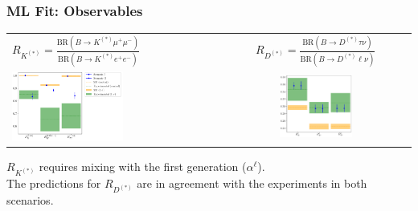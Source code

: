 \documentclass[mathserif, 10pt, dvipsnames]{beamer}
\begin{document}
\begin{frame}\frametitle{ML Fit: Observables}

    \begin{center}
        \begin{tabular}{lc}
            $R_{K^{(*)}} = \frac{\mathrm{BR}(B\to K^{(*)}\mu^+ \mu^-)}{\mathrm{BR}(B\to K^{(*)}e^+ e^-)}$ & $R_{D^{(*)}} = \frac{\mathrm{BR}(B\to D^{(*)}\tau \nu)}{\mathrm{BR}(B\to D^{(*)}\ell \nu)}$ \\
            \includegraphics[width=0.55\textwidth]{figures/rotRKplot.pdf}                                 &
            \includegraphics[width=0.4\textwidth]{figures/rotRDplot.pdf}
        \end{tabular}
    \end{center}
$R_{K^{(*)}}$ requires mixing with the first generation ($\alpha^\ell$).\\
The predictions for $R_{D^{(*)}}$ are in agreement with the experiments in both scenarios.


\end{frame}
\end{document}
